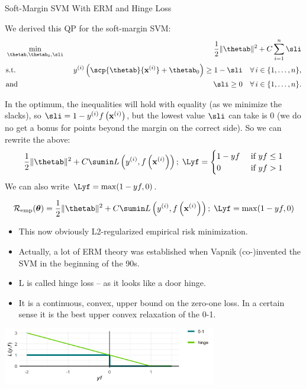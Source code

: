 \documentclass[11pt,compress,t,notes=noshow, xcolor=table]{beamer}
\begin{document}
\begin{vbframe}{Soft-Margin SVM With ERM and Hinge Loss}

We derived this QP for the soft-margin SVM: 
  \begin{eqnarray*}
    & \min\limits_{\thetab, \thetab_0,\sli} & \frac{1}{2} \|\thetab\|^2 + C   \sum_{i=1}^n \sli \\
    & \text{s.t.} & \,\, \yi  \left( \scp{\thetab}{\xi} + \thetab_0 \right) \geq 1 - \sli \quad \forall\, i \in \nset,\\
    & \text{and} & \,\, \sli \geq 0 \quad \forall\, i \in \nset.
  \end{eqnarray*}

  In the optimum, the inequalities will hold with equality (as we minimize the slacks), so $\sli = 1 - \yi \fxi$, but the lowest value $\sli$ can take is 0 (we do no get a bonus for points beyond the margin on the correct side).
  So we can rewrite the above: 
\begin{align*} 
    \frac{1}{2} \|\thetab\|^2 + C \sumin \Lxyi ;\; \Lyf = 
    \begin{cases} 
      1 - y f & \text{ if } y f \leq 1 \\ 
      0       & \text{ if } y f > 1 
    \end{cases}
\end{align*} 
We can also write $\Lyf = \max(1-yf, 0)$.

\framebreak
  $$ \risket = \frac{1}{2} \|\thetab\|^2 + C \sumin \Lxyi ;\; \Lyf = \max(1-yf, 0)$$
  \begin{itemize}
    \item This now obviously L2-regularized empirical risk minimization.
    \item Actually, a lot of ERM theory was established when Vapnik (co-)invented the SVM in the beginning of the 90s.
    \item L is called hinge loss -- as it looks like a door hinge.
    \item It is a continuous, convex, upper bound on the zero-one loss.
      In a certain sense it is the best upper convex relaxation of the 0-1.
  \end{itemize}


\begin{center}
\includegraphics[width = 0.7\textwidth]{figure/soft_margin_losses.png} \\
\end{center}


\end{vbframe}
\end{document}
